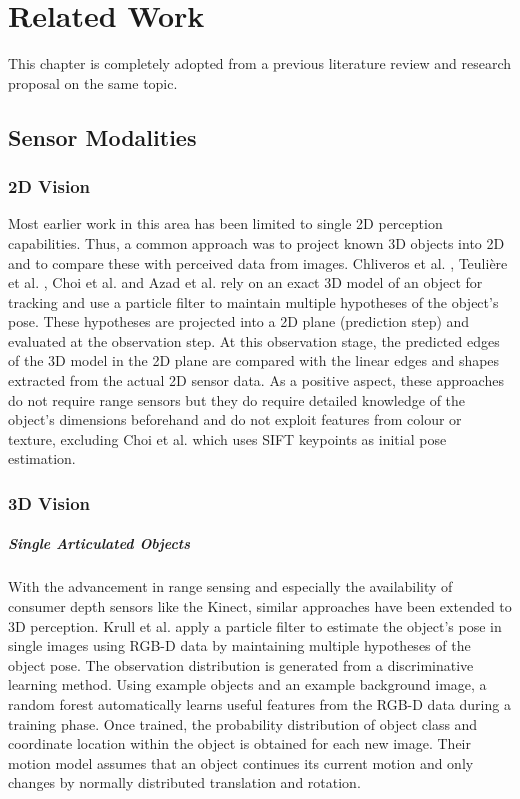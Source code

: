 \chapter{Related Work}

This chapter is completely adopted from a previous literature review and research proposal on the same topic.

\section{Sensor Modalities}

\subsection{2D Vision}
Most earlier work in this area has been limited to single 2D perception capabilities. Thus, a common approach was to project known 3D objects into 2D and to compare these with perceived data from images. Chliveros et al. \cite{Chliveros2013}, Teuli\`ere et al. \cite{Teuliere2010}, Choi et al. \cite{Choi2012} and Azad et al. \cite{Azad2011} rely on an exact 3D model of an object for tracking and use a particle filter to maintain multiple hypotheses of the object's pose. These hypotheses are projected into a 2D plane (prediction step) and evaluated at the observation step. At this observation stage, the predicted edges of the 3D model in the 2D plane are compared with the linear edges and shapes extracted from the actual 2D sensor data. As a positive aspect, these approaches do not require range sensors but they do require detailed knowledge of the object's dimensions beforehand and do not exploit features from colour or texture, excluding Choi et al. which uses SIFT keypoints as initial pose estimation.

\subsection{3D Vision}
\label{sec:3d_vision}

\paragraph{Single Articulated Objects}
With the advancement in range sensing and especially the availability of consumer depth sensors like the Kinect, similar approaches have been extended to 3D perception. Krull et al. \cite{Krull2015} apply a particle filter to estimate the object's pose in single images using RGB-D data by maintaining multiple hypotheses of the object pose. The observation distribution is generated from a discriminative learning method. Using example objects and an example background image, a random forest automatically learns useful features from the RGB-D data during a training phase. Once trained, the probability distribution of object class and coordinate location within the object is obtained for each new image. Their motion model assumes that an object continues its current motion and only changes by normally distributed translation and rotation.


